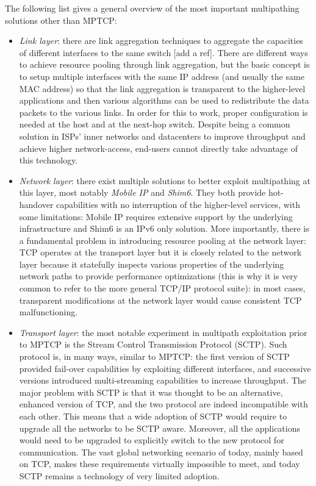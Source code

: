 The following list gives a general overview of the most important multipathing solutions other than MPTCP:
\begin{itemize}
  \item \textit{Link layer}: there are link aggregation techniques to aggregate the capacities of different interfaces to the same switch [add a ref]. There are different ways to achieve resource pooling through link aggregation, but the basic concept is to setup multiple interfaces with the same IP address (and usually the same MAC address) so that the link aggregation is transparent to the higher-level applications and then various algorithms can be used to redistribute the data packets to the various links. In order for this to work, proper configuration is needed at the host and at the next-hop switch. Despite being a common solution in ISPs' inner networks and datacenters to improve throughput and achieve higher network-access, end-users cannot directly take advantage of this technology.


  \item \textit{Network layer}: there exist multiple solutions to better exploit multipathing at this layer, most notably \textit{Mobile IP} and \textit{Shim6}. They both provide hot-handover capabilities with no interruption of the higher-level services, with some limitations: Mobile IP requires extensive support by the underlying infrastructure and Shim6 is an IPv6 only solution. More importantly, there is a fundamental problem in introducing resource pooling at the network layer: TCP operates at the transport layer but it is closely related to the network layer because it statefully inspects various properties of the underlying network paths to provide performance optimizations (this is why it is very common to refer to the more general TCP/IP protocol suite): in most cases, transparent modifications at the network layer would cause consistent TCP malfunctioning.


  \item \textit{Transport layer}: the most notable experiment in multipath exploitation prior to MPTCP is the Stream Control Transmission Protocol (SCTP). Such protocol is, in many ways, similar to MPTCP: the first version of SCTP provided fail-over capabilities by exploiting different interfaces, and successive versions introduced multi-streaming capabilities to increase throughput. The major problem with SCTP is that it was thought to be an alternative, enhanced version of TCP, and the two protocol are indeed incompatible with each other. This means that a wide adoption of SCTP would require to upgrade all the networks to be SCTP aware. Moreover, all the applications would need to be upgraded to explicitly switch to the new protocol for communication. The vast global networking scenario of today, mainly based on TCP, makes these requirements virtually impossible to meet, and today SCTP remains a technology of very limited adoption.
\end{itemize}



